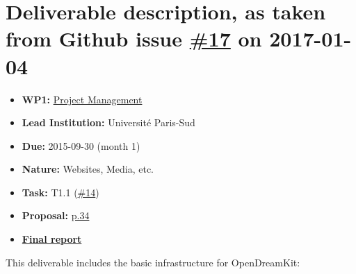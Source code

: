 \section*{\texorpdfstring{Deliverable description, as taken from Github
issue
\href{https://github.com/OpenDreamKit/OpenDreamKit/issues/17}{\#17} on
2017-01-04}{Deliverable description, as taken from Github issue \#17 on 2017-01-04}}\label{deliverable-description-as-taken-from-github-issue-17-on-2017-01-04}

\begin{itemize}
\tightlist
\item
  \textbf{WP1:}
  \href{https://github.com/OpenDreamKit/OpenDreamKit/tree/master/WP1}{Project
  Management}
\item
  \textbf{Lead Institution:} Université Paris-Sud
\item
  \textbf{Due:} 2015-09-30 (month 1)
\item
  \textbf{Nature:} Websites, Media, etc.
\item
  \textbf{Task:} T1.1
  (\href{https://github.com/OpenDreamKit/OpenDreamKit/issues/14}{\#14})
\item
  \textbf{Proposal:}
  \href{https://github.com/OpenDreamKit/OpenDreamKit/raw/master/Proposal/proposal-www.pdf}{p.34}
\item
  \textbf{\href{https://github.com/OpenDreamKit/OpenDreamKit/raw/master/WP1/D1.1/report-final.pdf}{Final
  report}}
\end{itemize}

This deliverable includes the basic infrastructure for OpenDreamKit:

